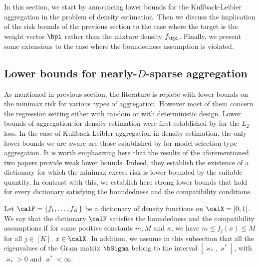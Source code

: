 In this section, we start by announcing lower bounds for the Kullback-Leibler aggregation
in the problem of density estimation. Then we discuss the implication of the risk bounds of the
previous section to the case where the target is the weight vector $\bpi$ rather than the
mixture density $f_{\bpi}$. Finally, we present some extensions to the case where the boundedness
assumption is violated.

\subsection{Lower bounds for nearly-$D$-sparse aggregation}
\label{ssec:lower}

As mentioned in previous section, the literature is replete with lower bounds on the minimax
risk for various types of aggregation. However most of them concern the regression setting either
with random or with deterministic design. Lower bounds of aggregation for density estimation were
first established by \cite{rigollet:these} for the $L_2$-loss. In the case of Kullback-Leibler
aggregation in density estimation, the only lower bounds we are aware are those established
by \cite{Lecue06} for model-selection type aggregation. It is worth emphasizing here that the
results of the aforementioned two papers provide weak lower bounds. Indeed, they establish
the existence of a dictionary for which the minimax excess risk is lower bounded by the
suitable quantity. In contrast with this, we establish here strong lower bounds that hold
for every dictionary satisfying the boundedness and the compatibility conditions.

Let $\calF = \{f_1,\ldots,f_K\}$ be a dictionary of density functions on $\calX =[0,1]$.
We say that the dictionary $\calF$ satisfies the boundedness and the compatibility assumptions
if for some positive constants $m,M$ and $\kappa$, we have $m \le f_j(x)\le M $ for all
$j\in[K]$, $x\in\calX$. In addition,  we assume in this subsection that all the eigenvalues 
of the Gram matrix $\bSigma$ belong to the interval $[\varkappa_*,\varkappa^*]$, with 
$\varkappa_*>0$ and $\varkappa^*<\infty$. 


